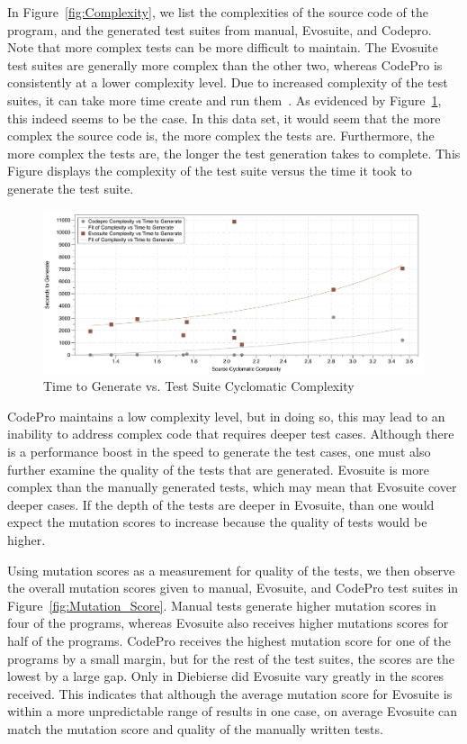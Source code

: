 \documentclass[conference]{IEEEtran}
\begin{document}
In Figure~\ref{fig:Complexity}, we list the complexities of the source code of the program, and the generated test suites from manual, Evosuite, and Codepro. Note that more complex tests can be more difficult to maintain. The Evosuite test suites are generally more complex than the other two, whereas CodePro is consistently at a lower complexity level. Due to increased complexity of the test suites, it can take more time create and run them~\cite{alspaugh:2007}. As evidenced by Figure~\ref{fig:Time_Complexity}, this indeed seems to be the case. In this data set, it would seem that the more complex the source code is, the more complex the tests are. Furthermore, the more complex the tests are, the longer the test generation takes to complete. This Figure displays the complexity of the test suite versus the time it took to generate the test suite. 

\begin{figure}[!t]
\centering
  \includegraphics[width=\textwidth]{Time_Complexity}
    \caption{Time to Generate vs. Test Suite Cyclomatic Complexity}
  \label{fig:Time_Complexity}
\end{figure}


CodePro maintains a low complexity level, but in doing so, this may lead to an inability to address complex code that requires deeper test cases. Although there is a performance boost in the speed to generate the test cases, one must also further examine the quality of the tests that are generated. Evosuite is more complex than the manually generated tests, which may mean that Evosuite cover deeper cases. If the depth of the tests are deeper in Evosuite, than one would expect the mutation scores to increase because the quality of tests would be higher. 

Using mutation scores as a measurement for quality of the tests, we then observe the overall mutation scores given to manual, Evosuite, and CodePro test suites in Figure~\ref{fig:Mutation_Score}. Manual tests generate higher mutation scores in four of the programs, whereas Evosuite also receives higher mutations scores for half of the programs. CodePro receives the highest mutation score for one of the programs by a small margin, but for the rest of the test suites, the scores are the lowest by a large gap. Only in Diebierse did Evosuite vary greatly in the scores received. This indicates that although the average mutation score for Evosuite is within a more unpredictable range of results in one case, on average Evosuite can match the mutation score and quality of the manually written tests.
\end{document}
